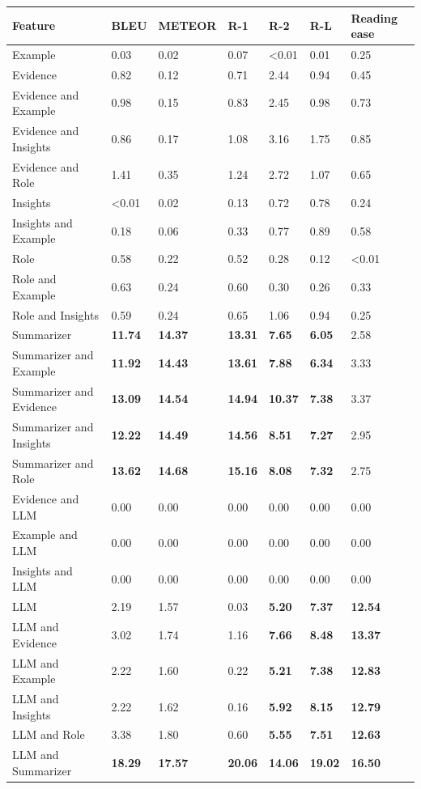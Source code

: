 \begin{tabular}{|l|l|l|l|l|l|l|}
\hline
\textbf{Feature} & BLEU & METEOR & R-1 & R-2 & R-L & Reading ease \\
 \hline
 Example & 0.03 & 0.02 & 0.07 & \textless{}0.01 & 0.01 & 0.25 \\
 \hline
 Evidence & 0.82 & 0.12 & 0.71 & 2.44 & 0.94 & 0.45 \\
 \hline
 Evidence and Example & 0.98 & 0.15 & 0.83 & 2.45 & 0.98 & 0.73 \\
 \hline
 Evidence and Insights & 0.86 & 0.17 & 1.08 & 3.16 & 1.75 & 0.85 \\
 \hline
 Evidence and Role & 1.41 & 0.35 & 1.24 & 2.72 & 1.07 & 0.65 \\
 \hline
 Insights & \textless{}0.01 & 0.02 & 0.13 & 0.72 & 0.78 & 0.24 \\
 \hline
 Insights and Example & 0.18 & 0.06 & 0.33 & 0.77 & 0.89 & 0.58 \\
 \hline
 Role & 0.58 & 0.22 & 0.52 & 0.28 & 0.12 & \textless{}0.01 \\
 \hline
 Role and Example & 0.63 & 0.24 & 0.60 & 0.30 & 0.26 & 0.33 \\
 \hline
 Role and Insights & 0.59 & 0.24 & 0.65 & 1.06 & 0.94 & 0.25 \\
 \hline
 Summarizer & \textbf{11.74} & \textbf{14.37} & \textbf{13.31} & \textbf{7.65} & \textbf{6.05} & 2.58 \\
 \hline
 Summarizer and Example & \textbf{11.92} & \textbf{14.43} & \textbf{13.61} & \textbf{7.88} & \textbf{6.34} & 3.33 \\
 \hline
 Summarizer and Evidence & \textbf{13.09} & \textbf{14.54} & \textbf{14.94} & \textbf{10.37} & \textbf{7.38} & 3.37 \\
 \hline
 Summarizer and Insights & \textbf{12.22} & \textbf{14.49} & \textbf{14.56} & \textbf{8.51} & \textbf{7.27} & 2.95 \\
 \hline
 Summarizer and Role & \textbf{13.62} & \textbf{14.68} & \textbf{15.16} & \textbf{8.08} & \textbf{7.32} & 2.75 \\
 \hline
 Evidence and LLM & 0.00 & 0.00 & 0.00 & 0.00 & 0.00 & 0.00 \\
 \hline
 Example and LLM & 0.00 & 0.00 & 0.00 & 0.00 & 0.00 & 0.00 \\
 \hline
 Insights and LLM & 0.00 & 0.00 & 0.00 & 0.00 & 0.00 & 0.00 \\
 \hline
 LLM & 2.19 & 1.57 & 0.03 & \textbf{5.20} & \textbf{7.37} & \textbf{12.54} \\
 \hline
 LLM and Evidence & 3.02 & 1.74 & 1.16 & \textbf{7.66} & \textbf{8.48} & \textbf{13.37} \\
 \hline
 LLM and Example & 2.22 & 1.60 & 0.22 & \textbf{5.21} & \textbf{7.38} & \textbf{12.83} \\
 \hline
 LLM and Insights & 2.22 & 1.62 & 0.16 & \textbf{5.92} & \textbf{8.15} & \textbf{12.79} \\
 \hline
 LLM and Role & 3.38 & 1.80 & 0.60 & \textbf{5.55} & \textbf{7.51} & \textbf{12.63} \\
 \hline
 LLM and Summarizer & \textbf{18.29} & \textbf{17.57} & \textbf{20.06} & \textbf{14.06} & \textbf{19.02} & \textbf{16.50} \\
\hline
\end{tabular}

